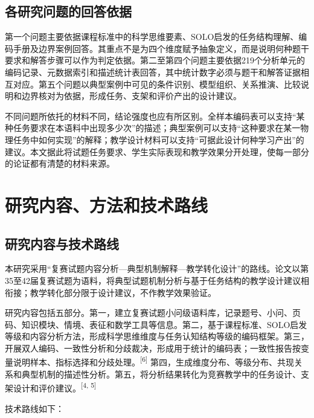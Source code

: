 \documentclass[
  12pt,
  a4paper]{ctexbook}
\begin{document}
\subsection{各研究问题的回答依据}\label{ux5404ux7814ux7a76ux95eeux9898ux7684ux56deux7b54ux4f9dux636e}

第一个问题主要依据课程标准中的科学思维要素、SOLO启发的任务结构理解、编码手册及边界案例回答。其重点不是为四个维度赋予抽象定义，而是说明何种题干要求和解答步骤可以作为判定依据。第二至第四个问题主要依据219个分析单元的编码记录、元数据索引和描述统计表回答，其中统计数字必须与题干和解答证据相互对应。第五个问题以典型案例中可见的条件识别、模型组织、关系推演、比较说明和边界核对为依据，形成任务、支架和评价产出的设计建议。

不同问题所依托的材料不同，结论强度也应有所区别。全样本编码表可以支持``某种任务要求在本语料中出现多少次''的描述；典型案例可以支持``这种要求在某一物理任务中如何实现''的解释；教学设计材料可以支持``可据此设计何种学习产出''的建议。本文据此将试题任务要求、学生实际表现和教学效果分开处理，使每一部分的论证都有清楚的材料来源。

\section{研究内容、方法和技术路线}\label{ux7814ux7a76ux5185ux5bb9ux65b9ux6cd5ux548cux6280ux672fux8defux7ebf}

\subsection{研究内容与技术路线}\label{ux7814ux7a76ux5185ux5bb9ux4e0eux6280ux672fux8defux7ebf}

本研究采用``复赛试题内容分析---典型机制解释---教学转化设计''的路线。论文以第35至42届复赛试题为语料，将典型试题机制分析与基于任务结构的教学设计建议相衔接；教学转化部分限于设计建议，不作教学效果验证。

研究内容包括五部分。第一，建立复赛试题小问级语料库，记录题号、小问、页码、知识模块、情境、表征和数学工具等信息。第二，基于课程标准、SOLO启发等级和内容分析方法，形成科学思维维度与任务认知结构等级的编码框架。第三，开展双人编码、一致性分析和分歧裁决，形成用于统计的编码表；一致性报告按变量说明样本、指标选择和分歧处理。\textsuperscript{[6]}
第四，生成维度分布、等级分布、共现关系和典型机制的描述性分析。第五，将分析结果转化为竞赛教学中的任务设计、支架设计和评价建议。\textsuperscript{[4, 5]}

技术路线如下：
\end{document}
